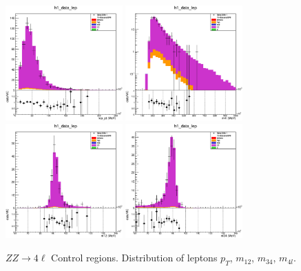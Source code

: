 \begin{figure}[htp]
\centering
\includegraphics[width=0.4\textwidth]{figures/ZZ_CR/ZZ_CR_lep_pt.eps}
\includegraphics[width=0.4\textwidth]{figures/ZZ_CR/ZZ_CR_m4l.eps}
\includegraphics[width=0.4\textwidth]{figures/ZZ_CR/ZZ_CR_m12.eps}
\includegraphics[width=0.4\textwidth]{figures/ZZ_CR/ZZ_CR_m34.eps}

\caption{$ZZ\to{}4\ell$ Control regions. Distribution of leptons $p_{T}$, $m_{12}$, $m_{34}$, $m_{4l}$.}
\label{fig:ZZ_CR}
\end{figure}  

